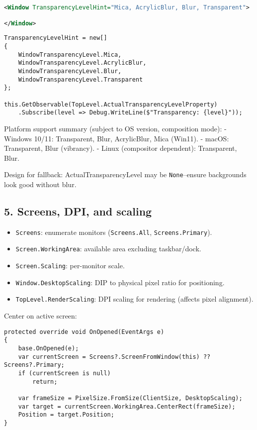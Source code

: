 \begin{lstlisting}[language=XML]
<Window TransparencyLevelHint="Mica, AcrylicBlur, Blur, Transparent">

</Window>
\end{lstlisting}

\begin{lstlisting}
TransparencyLevelHint = new[]
{
    WindowTransparencyLevel.Mica,
    WindowTransparencyLevel.AcrylicBlur,
    WindowTransparencyLevel.Blur,
    WindowTransparencyLevel.Transparent
};

this.GetObservable(TopLevel.ActualTransparencyLevelProperty)
    .Subscribe(level => Debug.WriteLine($"Transparency: {level}"));
\end{lstlisting}

Platform support summary (subject to OS version, composition mode): -
Windows 10/11: Transparent, Blur, AcrylicBlur, Mica (Win11). - macOS:
Transparent, Blur (vibrancy). - Linux (compositor dependent):
Transparent, Blur.

Design for fallback: ActualTransparencyLevel may be
\passthrough{\lstinline!None!}--ensure backgrounds look good without
blur.

\subsection{5. Screens, DPI, and scaling}\label{screens-dpi-and-scaling}

\begin{itemize}
\tightlist
\item
  \passthrough{\lstinline!Screens!}: enumerate monitors
  (\passthrough{\lstinline!Screens.All!},
  \passthrough{\lstinline!Screens.Primary!}).
\item
  \passthrough{\lstinline!Screen.WorkingArea!}: available area excluding
  taskbar/dock.
\item
  \passthrough{\lstinline!Screen.Scaling!}: per-monitor scale.
\item
  \passthrough{\lstinline!Window.DesktopScaling!}: DIP to physical pixel
  ratio for positioning.
\item
  \passthrough{\lstinline!TopLevel.RenderScaling!}: DPI scaling for
  rendering (affects pixel alignment).
\end{itemize}

Center on active screen:

\begin{lstlisting}
protected override void OnOpened(EventArgs e)
{
    base.OnOpened(e);
    var currentScreen = Screens?.ScreenFromWindow(this) ?? Screens?.Primary;
    if (currentScreen is null)
        return;

    var frameSize = PixelSize.FromSize(ClientSize, DesktopScaling);
    var target = currentScreen.WorkingArea.CenterRect(frameSize);
    Position = target.Position;
}
\end{lstlisting}

